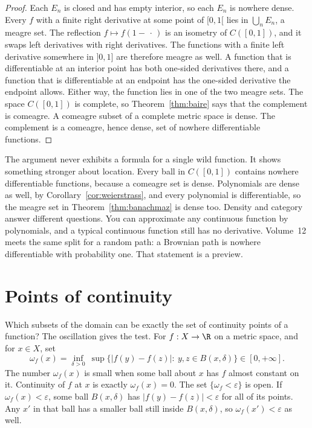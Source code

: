 \begin{proof}
Each $E_n$ is closed and has empty interior, so each $E_n$ is nowhere dense. Every $f$ with a finite right derivative at some point of $[0,1[$ lies in $\bigcup_n E_n$, a meagre set. The reflection $f\mapsto f(1-\,\cdot\,)$ is an isometry of $C([0,1])$, and it swaps left derivatives with right derivatives. The functions with a finite left derivative somewhere in $]0,1]$ are therefore meagre as well. A function that is differentiable at an interior point has both one-sided derivatives there, and a function that is differentiable at an endpoint has the one-sided derivative the endpoint allows. Either way, the function lies in one of the two meagre sets. The space $C([0,1])$ is complete, so Theorem~\ref{thm:baire} says that the complement is comeagre. A comeagre subset of a complete metric space is dense. The complement is a comeagre, hence dense, set of nowhere differentiable functions.
\end{proof}

\begin{beauty}
The argument never exhibits a formula for a single wild function. It shows something stronger about location. Every ball in $C([0,1])$ contains nowhere differentiable functions, because a comeagre set is dense. Polynomials are dense as well, by Corollary~\ref{cor:weierstrass}, and every polynomial is differentiable, so the meagre set in Theorem~\ref{thm:banachmaz} is dense too. Density and category answer different questions. You can approximate any continuous function by polynomials, and a typical continuous function still has no derivative. Volume~12 meets the same split for a random path: a Brownian path is nowhere differentiable with probability one. That statement is a preview.
\end{beauty}

\section{Points of continuity}

Which subsets of the domain can be exactly the set of continuity points of a function? The oscillation gives the test. For $f:X\to\R$ on a metric space, and for $x\in X$, set
\[\omega_f(x)=\inf_{\delta>0}\ \sup\{|f(y)-f(z)|:\ y,z\in B(x,\delta)\}\in[0,+\infty].\]
The number $\omega_f(x)$ is small when some ball about $x$ has $f$ almost constant on it. Continuity of $f$ at $x$ is exactly $\omega_f(x)=0$. The set $\{\omega_f<\varepsilon\}$ is open. If $\omega_f(x)<\varepsilon$, some ball $B(x,\delta)$ has $|f(y)-f(z)|<\varepsilon$ for all of its points. Any $x'$ in that ball has a smaller ball still inside $B(x,\delta)$, so $\omega_f(x')<\varepsilon$ as well.

